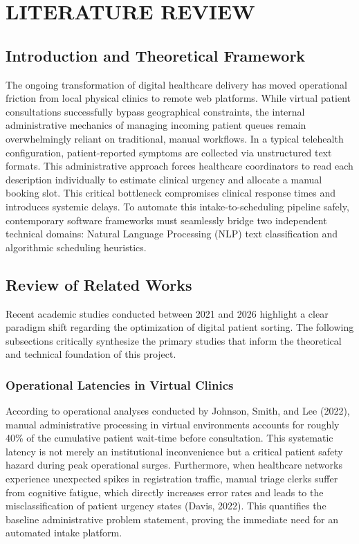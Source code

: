 \documentclass[12pt,a4paper]{report}
\begin{document}
\chapter{LITERATURE REVIEW}

\section{Introduction and Theoretical Framework}
The ongoing transformation of digital healthcare delivery has moved operational friction from local physical clinics to remote web platforms. While virtual patient consultations successfully bypass geographical constraints, the internal administrative mechanics of managing incoming patient queues remain overwhelmingly reliant on traditional, manual workflows. In a typical telehealth configuration, patient-reported symptoms are collected via unstructured text formats. This administrative approach forces healthcare coordinators to read each description individually to estimate clinical urgency and allocate a manual booking slot. This critical bottleneck compromises clinical response times and introduces systemic delays. To automate this intake-to-scheduling pipeline safely, contemporary software frameworks must seamlessly bridge two independent technical domains: Natural Language Processing (NLP) text classification and algorithmic scheduling heuristics.

\section{Review of Related Works}
Recent academic studies conducted between 2021 and 2026 highlight a clear paradigm shift regarding the optimization of digital patient sorting. The following subsections critically synthesize the primary studies that inform the theoretical and technical foundation of this project.

\subsection{Operational Latencies in Virtual Clinics}
According to operational analyses conducted by Johnson, Smith, and Lee (2022), manual administrative processing in virtual environments accounts for roughly 40\% of the cumulative patient wait-time before consultation. This systematic latency is not merely an institutional inconvenience but a critical patient safety hazard during peak operational surges. Furthermore, when healthcare networks experience unexpected spikes in registration traffic, manual triage clerks suffer from cognitive fatigue, which directly increases error rates and leads to the misclassification of patient urgency states (Davis, 2022). This quantifies the baseline administrative problem statement, proving the immediate need for an automated intake platform.
\end{document}
